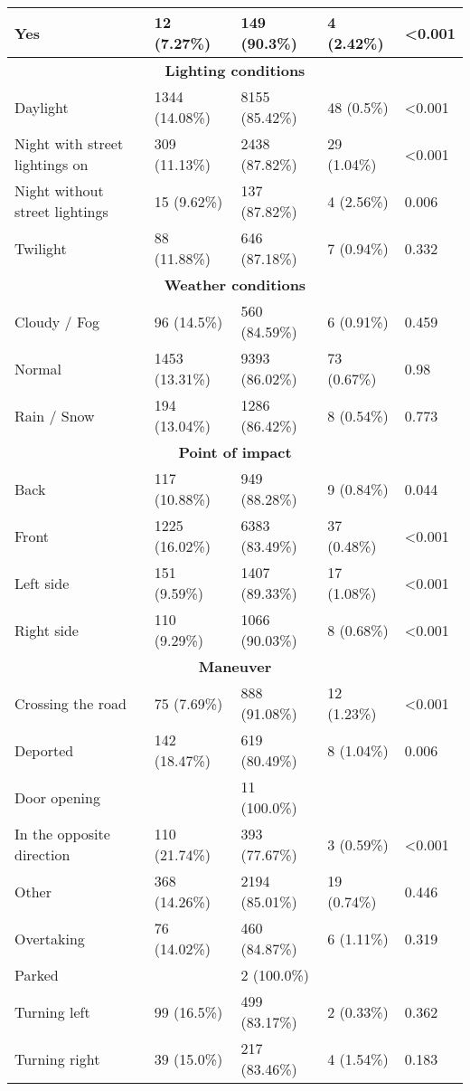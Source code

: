 \begin{longtable}{p{4.5cm}p{3cm}p{3cm}p{3cm}p{1.5cm}}
Yes & 12 (7.27\%) & 149 (90.3\%) & 4 (2.42\%) & <0.001  \\
\hline
\multicolumn{5}{c}{\textbf{Lighting conditions}} \\
Daylight & 1344 (14.08\%) & 8155 (85.42\%) & 48 (0.5\%) & <0.001  \\
Night with street lightings on & 309 (11.13\%) & 2438 (87.82\%) & 29 (1.04\%) & <0.001  \\
Night without street lightings & 15 (9.62\%) & 137 (87.82\%) & 4 (2.56\%) & 0.006  \\
Twilight & 88 (11.88\%) & 646 (87.18\%) & 7 (0.94\%) & 0.332  \\
\hline
\multicolumn{5}{c}{\textbf{Weather conditions}} \\
Cloudy / Fog & 96 (14.5\%) & 560 (84.59\%) & 6 (0.91\%) & 0.459  \\
Normal & 1453 (13.31\%) & 9393 (86.02\%) & 73 (0.67\%) & 0.98  \\
Rain / Snow & 194 (13.04\%) & 1286 (86.42\%) & 8 (0.54\%) & 0.773  \\
\hline
\multicolumn{5}{c}{\textbf{Point of impact}} \\
Back & 117 (10.88\%) & 949 (88.28\%) & 9 (0.84\%) & 0.044  \\
Front & 1225 (16.02\%) & 6383 (83.49\%) & 37 (0.48\%) & <0.001  \\
Left side & 151 (9.59\%) & 1407 (89.33\%) & 17 (1.08\%) & <0.001  \\
Right side & 110 (9.29\%) & 1066 (90.03\%) & 8 (0.68\%) & <0.001  \\
\hline
\multicolumn{5}{c}{\textbf{Maneuver}} \\
Crossing the road & 75 (7.69\%) & 888 (91.08\%) & 12 (1.23\%) & <0.001  \\
Deported & 142 (18.47\%) & 619 (80.49\%) & 8 (1.04\%) & 0.006  \\
Door opening &  & 11 (100.0\%) &  &   \\
In the opposite direction & 110 (21.74\%) & 393 (77.67\%) & 3 (0.59\%) & <0.001  \\
Other & 368 (14.26\%) & 2194 (85.01\%) & 19 (0.74\%) & 0.446  \\
Overtaking & 76 (14.02\%) & 460 (84.87\%) & 6 (1.11\%) & 0.319  \\
Parked &  & 2 (100.0\%) &  &   \\
Turning left & 99 (16.5\%) & 499 (83.17\%) & 2 (0.33\%) & 0.362  \\
Turning right & 39 (15.0\%) & 217 (83.46\%) & 4 (1.54\%) & 0.183  \\

\end{longtable}
